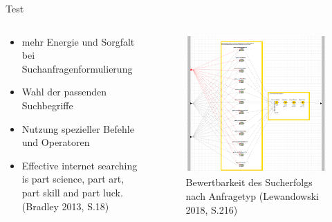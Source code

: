 \documentclass[
	handout,
  	aspectratio=169
]{beamer}
\begin{document}
	\begin{frame}{Test}
		\begin{columns}[T]
   				\begin{column}{.5\textwidth}
					\begin{itemize}
						\item mehr Energie und Sorgfalt bei Suchanfragenformulierung
						\item Wahl der passenden Suchbegriffe
						\item Nutzung spezieller Befehle und Operatoren
						\item \glqq{}Effective internet searching is part science, part art, part skill and part luck.\grqq{} (Bradley 2013, S.18)
					\end{itemize}
    				\end{column}
    				
    				\begin{column}{.5\textwidth}
					\begin{figure}[h]
						\includegraphics[scale=0.2]{../pictures/trees-workflow-getAccuracys.png}
						\caption{Bewertbarkeit des Sucherfolgs nach Anfragetyp (Lewandowski 2018, S.216)}		
					\end{figure}					
    				\end{column}
  			\end{columns}
	\end{frame}
\end{document}

